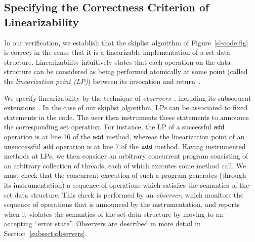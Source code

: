 \subsection{Specifying the Correctness Criterion of Linearizability}
In our verification, we establish that the skiplist algorithm of
Figure~\ref{sl-code:fig} is correct in the sense that it is a
linearizable implementation of a set data structure.
Linearizability intuitively states that
each operation on the data structure can be considered as being
performed atomically at some point (called the {\em linearization point (LP)})
between its invocation and return~\cite{HeWi:linearizability}.

We specify linearizability by the technique of
{\em observers}~\cite{AHHR:integrated}, including its subsequent
extensions~\cite{BEEH:icalp15,HSV:concur13,Quy:sas16}.
In the case of our skiplist algorithm,
LPs can be associated to fixed statements in the code. The user then instruments
these statements to announce the corresponding set operation.
For instance, the LP of a successful {\tt add} operation is at line 16 of the $\tt add$ method, whereas the linearization point of an unsuccessful {\tt add} operation is at line 7 of the $\tt add$ method.  %
Having instrumented methods at LPs, we
then consider an arbitrary concurrent program consisting of
an arbitrary collection of threads, each of which executes some method call.
We must check that the concurrent execution of such a program generates
(through its instrumentation) a sequence of operations which satisfies the
semantics of the set data structure. 
This check is performed by an {\em observer}, which 
monitors the sequence of operations that is announced by the
instrumentation, and reports when it violates the semantics of the set
data structure by moving to an accepting ``error state''.
Observers are described in more detail in Section~\ref{subsect:observers}.



